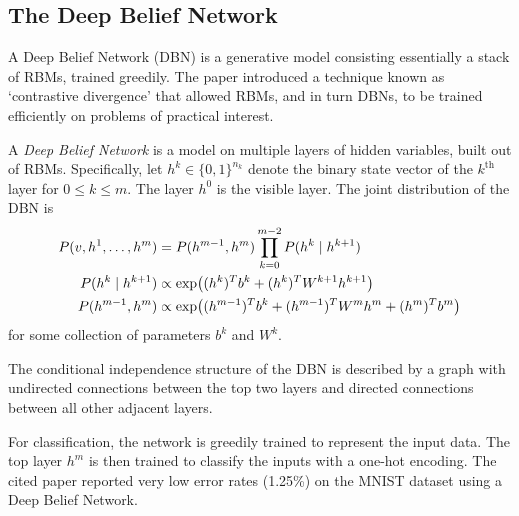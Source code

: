 \documentclass[11pt,titlepage]{article}
\numberwithin{equation}{section}
\begin{document}
\subsection{The Deep Belief Network}
    A Deep Belief Network (DBN) is a generative model consisting essentially a
    stack of RBMs, trained greedily.  The paper \cite{Hin07} introduced a
    technique known as `contrastive divergence' that allowed RBMs, and in turn
    DBNs, to be trained efficiently on problems of practical interest.
    \begin{definition}
    A \emph{Deep Belief Network} is a model on multiple layers of hidden
    variables, built out of RBMs.  Specifically, let $h^k \in \{0,1\}^{n_k}$
    denote the binary state vector of the $k^{\text{th}}$ layer for $0 \le k \le
    m$.  The layer $h^0$ is the visible layer.  The joint distribution of the
    DBN is
    \begin{align*}
        P(v,h^1, \ldots, h^m) &= P(h^{m-1}, h^m) \prod_{k=0}^{m-2} P(h^k \mid h^{k+1})\\
        P(h^k\mid h^{k+1}) &\propto \exp\pdil*{(h^k)^Tb^k + (h^k)^T W^{k+1} h^{k+1}}\\
        P(h^{m-1}, h^{m}) &\propto  \exp\pdil*{(h^{m-1})^T b^k + (h^{m-1})^T W^m
        h^m + (h^m)^T b^m}
    \end{align*}
    for some collection of parameters $b^k$ and $W^k$.
    \end{definition}

    The conditional independence structure of the DBN is described by a graph
    with undirected connections between the top two layers and directed
    connections between all other adjacent layers.
    \begin{center}
    \end{center}
    For classification, the network is greedily trained to represent the input
    data.  The top layer $h^m$ is then trained to classify the inputs with a
    one-hot encoding.  The cited paper reported very low error rates (1.25\%) on
    the MNIST dataset using a Deep Belief Network.



\end{document}
